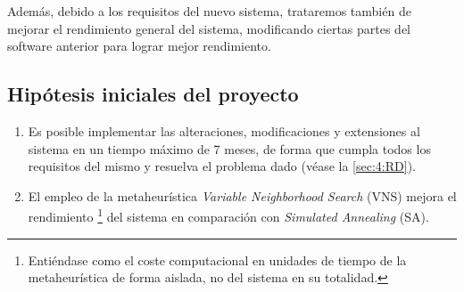 Además, debido a los requisitos del nuevo sistema, trataremos también de mejorar el rendimiento general del sistema, modificando ciertas partes del software anterior para lograr mejor rendimiento.

\subsection{Hipótesis iniciales del proyecto}
\label{sec:Hipotesis}
\begin{enumerate}[label={H\arabic*}]
	\item \label{H1} Es posible implementar las alteraciones, modificaciones y extensiones al sistema en un tiempo máximo de 7 meses, de forma que cumpla todos los requisitos del mismo y resuelva el problema dado (véase la \autoref{sec:4:RD}).
	\item \label{H2} El empleo de la metaheurística \textit{Variable Neighborhood Search} (VNS) mejora el rendimiento%
	\footnote{Entiéndase como el coste computacional en unidades de tiempo  de la metaheurística de forma aislada, no del sistema en su totalidad.}
	del sistema en comparación con \textit{Simulated Annealing} (SA).
\end{enumerate}

%
%
\glsaddall
\printglossary[title={Definiciones, acrónimos y abreviaturas}, nonumberlist]
%
%
%